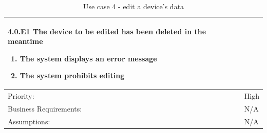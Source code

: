 \documentclass{scrreprt}
\begin{document}
\begin{table}[H]
\begin{adjustbox}{width=1.1\textwidth,center=\textwidth}
\begin{tabular}{|m{4cm}|m{12cm}|}
            \textbf{4.0.E1  The device to be edited has been deleted in the meantime}
            \begin{enumerate}
                \item The system displays an error message
                \item The system prohibits editing
            \end{enumerate} \\
            \hline
            Priority: & High \\
            \hline
            Business Requirements: & N/A \\
            \hline
            Assumptions: & N/A \\
            \hline
        \end{tabular}
    \end{adjustbox}
    \caption{Use case 4 - edit a device's data}
    \label{use case 4}
\end{table}
\end{document}
